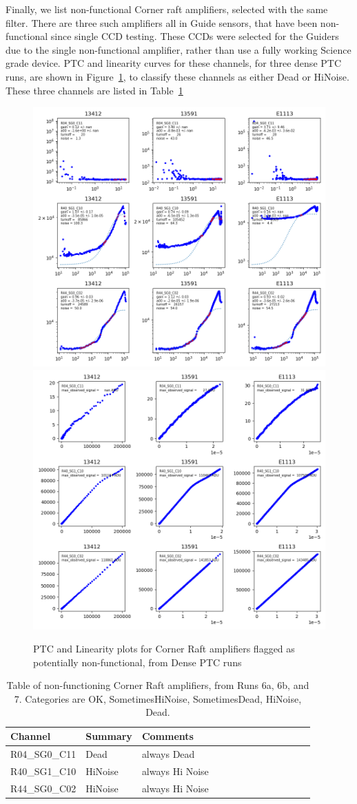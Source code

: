 Finally, we list non-functional Corner raft amplifiers, selected with the same filter.  There are three such amplifiers all in Guide sensors, that have been non-functional since single CCD testing.  These CCDs were selected for the Guiders due to the single non-functional amplifier, rather than use a fully working Science grade device. PTC and linearity curves for these channels, for three dense PTC runs, are shown in Figure~\ref{fig:ptclin-badamps-corner}, to classify these channels as either Dead or HiNoise. These three channels are listed in Table~\ref{tab:badamps-corner}

\begin{figure}
    \centering
    \includegraphics[width=0.45\linewidth]{figures/ptc_badamps_corner.png}
    \includegraphics[width=0.45\linewidth]{figures/lin_badamps_corner.png}
    \caption{PTC and Linearity plots for Corner Raft amplifiers flagged as potentially non-functional, from Dense PTC runs}
    \label{fig:ptclin-badamps-corner}
\end{figure}

\begin{table}[!ht]
    \tiny
    \centering
    \begin{tabular}{|l|l|l|l|l|l|l|l|l|l|l|l|l|}
    \hline
        Channel & Summary & Comments  \\ \hline

R04\_SG0\_C11  & Dead & always Dead \\ \hline
R40\_SG1\_C10  & HiNoise & always Hi Noise \\ \hline
R44\_SG0\_C02  & HiNoise & always Hi Noise\\ \hline

    \end{tabular}
    \caption{Table of non-functioning Corner Raft amplifiers, from Runs 6a, 6b, and 7. Categories are OK, SometimesHiNoise, SometimesDead, HiNoise, Dead. \label{tab:badamps-corner}}
\end{table}


